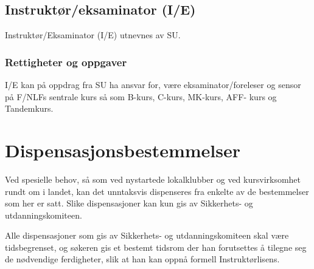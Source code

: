 \subsection{Instruktør/eksaminator (I/E)}
Instruktør/Eksaminator (I/E) utnevnes av SU.

\subsubsection{Rettigheter og oppgaver}
I/E kan på oppdrag fra SU ha ansvar for, være eksaminator/foreleser og sensor på F/NLFs sentrale kurs så som B-kurs, C-kurs, MK-kurs, AFF- kurs og Tandemkurs.

\section{Dispensasjonsbestemmelser}
Ved spesielle behov, så som ved nystartede lokalklubber og ved kursvirksomhet rundt om i landet, kan det unntaksvis dispenseres fra enkelte av de bestemmelser som her er satt. Slike dispensasjoner kan kun gis av Sikkerhets- og utdanningskomiteen.

Alle dispensasjoner som gis av Sikkerhets- og utdanningskomiteen skal være tidsbegrenset, og søkeren gis et bestemt tidsrom der han forutsettes å tilegne seg de nødvendige ferdigheter, slik at han kan oppnå formell Instruktørlisens.
